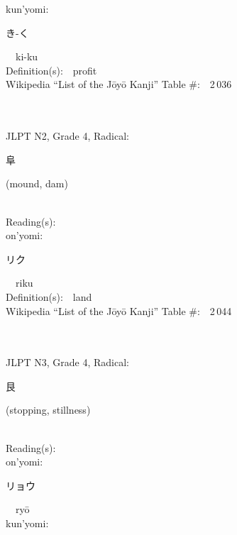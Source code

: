 \begin{multicols}{2}
{\hspace*{1em}}kun'yomi:\ \ \\
{\hspace*{2em}}{\begin{CJK}{UTF8}{min} き-く \end{CJK}}\ \ ki-ku\ \ \\
Definition(s):\ \ profit \\
Wikipedia ``List of the J\=oy\=o Kanji'' Table \#:\ \ 2\,036 \\
\ \ \\
{\fontsize{34pt}{40pt}  }\ \ \\  %
{JLPT N2, Grade 4, Radical:\ \ {\begin{CJK}{UTF8}{min} 阜 \end{CJK}} (mound, dam) } \\
Reading(s):\ \ \\
{\hspace*{1em}}on'yomi:\ \ \\
{\hspace*{2em}}{\begin{CJK}{UTF8}{min} リク \end{CJK}}\ \ riku\ \ \\
Definition(s):\ \ land \\
Wikipedia ``List of the J\=oy\=o Kanji'' Table \#:\ \ 2\,044 \\
\ \ \\
{\fontsize{34pt}{40pt}  }\ \ \\  %
{JLPT N3, Grade 4, Radical:\ \ {\begin{CJK}{UTF8}{min} 艮 \end{CJK}} (stopping, stillness) } \\
Reading(s):\ \ \\
{\hspace*{1em}}on'yomi:\ \ \\
{\hspace*{2em}}{\begin{CJK}{UTF8}{min} リョウ \end{CJK}}\ \ ry\=o\ \ \\
{\hspace*{1em}}kun'yomi:\ \ \\

\end{multicols}
